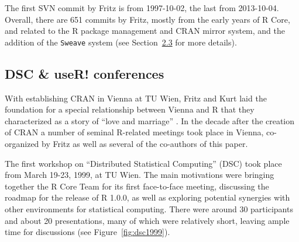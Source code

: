 The first SVN commit by Fritz is from 1997-10-02, the last from
2013-10-04. Overall, there are 651 commits by Fritz, mostly from the
early years of R Core, and related to the R package management and CRAN
mirror system, and the addition of the \texttt{Sweave} system
(see Section~\hyperref[sec:sweave-reproducibility]{2.3} for more details).

\subsection{DSC \& useR! conferences}\label{dsc-user-conferences}

With establishing CRAN in Vienna at TU Wien, Fritz and Kurt
laid the foundation for a special relationship between Vienna and R that they
characterized as a story of ``love and marriage'' \citep{Hornik+Leisch:2002}. In the decade
after the creation of CRAN a number of seminal R-related meetings took place in Vienna,
co-organized by Fritz as well as several of the co-authors of this paper.

The first workshop on ``Distributed Statistical Computing'' (DSC) took place from
March 19-23, 1999, at TU Wien. The main motivations were bringing together the R Core Team
for its first face-to-face meeting, discussing the roadmap for the release of R 1.0.0,
as well as exploring potential synergies with other environments for statistical computing.
There were around 30 participants and about 20 presentations, many of which were
relatively short, leaving ample time for discussions (see Figure~\ref{fig:dsc1999}).

